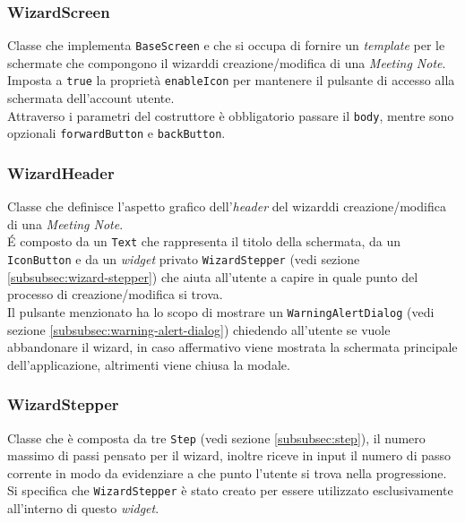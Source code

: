 \subsubsection*{WizardScreen}
\label{subsubsec:wizard-screen}

Classe che implementa \lstinline{BaseScreen} e che si occupa di fornire un \emph{template} per le schermate che compongono il \gls{wizard}\glsoccur di creazione/modifica di una \emph{Meeting Note}.\\
Imposta a \lstinline{true} la proprietà \lstinline{enableIcon} per mantenere il pulsante di accesso alla schermata dell'account utente.\\
Attraverso i parametri del costruttore è obbligatorio passare il \lstinline{body}, mentre sono opzionali \lstinline{forwardButton} e \lstinline{backButton}.\\

\subsubsection*{WizardHeader}
\label{subsubsec:wizard-header}

Classe che definisce l'aspetto grafico dell'\emph{header} del \gls{wizard}\glsoccur di creazione/modifica di una \emph{Meeting Note}.\\
É composto da un \lstinline{Text}\cite{site:text} che rappresenta il titolo della schermata, da un \lstinline{IconButton}\cite{site:icon-button} e da un \emph{widget} privato \lstinline{WizardStepper} (vedi sezione \ref{subsubsec:wizard-stepper}) che aiuta all'utente a capire in quale punto del processo di creazione/modifica si trova.\\
Il pulsante menzionato ha lo scopo di mostrare un \lstinline{WarningAlertDialog} (vedi sezione \ref{subsubsec:warning-alert-dialog}) chiedendo all'utente se vuole abbandonare il \gls{wizard}\glsoccur, in caso affermativo viene mostrata la schermata principale dell'applicazione, altrimenti viene chiusa la modale.\\    

\subsubsection*{WizardStepper}
\label{subsubsec:wizard-stepper}

Classe che è composta da tre \lstinline{Step} (vedi sezione \ref{subsubsec:step}), il numero massimo di passi pensato per il \gls{wizard}\glsoccur, inoltre riceve in input il numero di passo corrente in modo da evidenziare a che punto l'utente si trova nella progressione.
Si specifica che \lstinline{WizardStepper} è stato creato per essere utilizzato esclusivamente all'interno di questo \emph{widget}.\\

